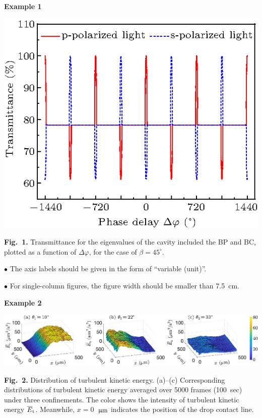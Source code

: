 \documentclass{cpbtex}
\begin{document}
\begin{CJK*}{GBK}{song}
\textbf{Example 1}

\begin{center}
\includegraphics{e1.eps}\\[5pt]  %
\parbox[c]{15.0cm}{\footnotesize{\bf Fig.~1.}   Transmittance for the eigenvalues of the cavity included
the BP and BC, plotted as a function of $\Delta \varphi $, for the case of
$\beta =45^\circ $.}
\end{center}

\textcolor[rgb]{0.98,0.00,0.00}{$\bullet$ The axis labels should be given in the form of ``variable (unit)''.}

\textcolor[rgb]{0.98,0.00,0.00}{$\bullet$ For single-column figures, the figure width should be smaller than 7.5~cm.}

\newpage
\textbf{Example 2}

\begin{center}
\includegraphics{e2.eps}\\[8pt]
\parbox[c]{15.0cm}{\footnotesize{\bf Fig.~2.}   %
 Distribution of turbulent kinetic energy. (a)--(c) Corresponding distributions of turbulent kinetic energy averaged over 5000 frames (100~sec) under three confinements. The color shows the intensity of turbulent kinetic energy $\overline{E}_{\rm t}$. Meanwhile, $x=0$~$\rm \upmu m$ indicates the position of the drop contact line.}
\end{center}


\end{CJK*}
\end{document}
